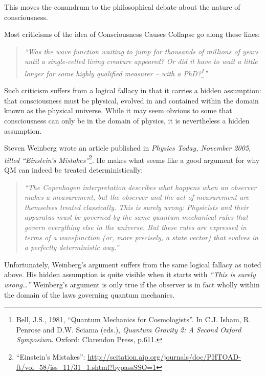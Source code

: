 \documentclass[11pt]{article}
\begin{document}
This moves the conundrum to the philosophical debate about the nature of consciousness.

Most criticisms of the idea of Consciousness Causes Collapse go along these lines:

\begin{quotation}
\em ``Was the wave function waiting to jump for thousands of millions of years
until a single-celled living creature appeared? Or did it have to wait a
little longer for some highly qualified measurer -- with a PhD?\footnote{ Bell, 
J.S., 1981, ``Quantum Mechanics for Cosmologists''. In C.J. Isham, R. Penrose and
D.W. Sciama (eds.), {\em Quantum Gravity 2: A Second Oxford Symposium}. Oxford:
Clarendon Press, p.611.}''
\end{quotation}

Such criticism suffers from a logical fallacy in that it carries a hidden
assumption: that consciousness must be physical, evolved in and contained within
the domain known as the physical universe. While it may seem obvious to some
that consciousness can only be in the domain of physics, it is nevertheless a
hidden assumption.

\newpage

Steven Weinberg wrote an article published in {\em Physics Today, November 2005,
titled ``Einstein's Mistakes''}\footnote{ ``Einstein's Mistakes'':
\url{http://scitation.aip.org/journals/doc/PHTOAD-ft/vol\_58/iss\_11/31\_1.shtml?bypassSSO=1}
}. He makes what seems like a good argument for why QM can indeed be treated
deterministically:

\begin{quotation}
\em ``The Copenhagen interpretation describes what happens when an observer
makes a measurement, but the observer and the act of measurement are themselves
treated classically. This is surely wrong: Physicists and their apparatus must
be governed by the same quantum mechanical rules that govern everything else in
the universe. But these rules are expressed in terms of a wavefunction (or,
more precisely, a state vector) that evolves in a perfectly deterministic
way.''
\end{quotation}

Unfortunately, Weinberg's argument suffers from the same logical fallacy as
noted above. His hidden assumption is quite visible when it starts with
{\em``This is surely wrong\ldots''} Weinberg's argument is only true if the
observer is in fact wholly within the domain of the laws governing quantum
mechanics.
\end{document}

